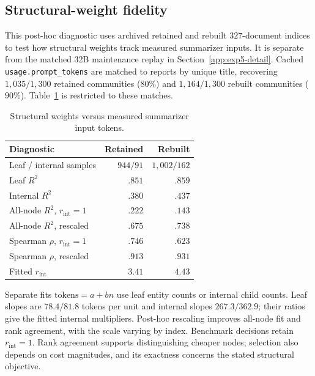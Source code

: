 \subsection{Structural-weight fidelity}\label{app:proxy-cal}

This post-hoc diagnostic uses archived retained and rebuilt
$327$-document indices to test how structural weights track measured
summarizer inputs. It is separate from the matched 32B maintenance replay
in Section~\ref{app:exp5-detail}. Cached \texttt{usage.prompt\_tokens}
are matched to reports by unique title, recovering $1{,}035/1{,}300$
retained communities ($80\%$) and $1{,}164/1{,}300$ rebuilt communities
($90\%$). Table~\ref{tab:proxy-validation} is restricted to these matches.

\begin{table}[tb]
\centering
\caption{Structural weights versus measured summarizer input tokens.}
\label{tab:proxy-validation}
\begin{footnotesize}
\begin{tabular*}{\linewidth}{@{\extracolsep{\fill}}lrr@{}}
\toprule
\textbf{Diagnostic} & \textbf{Retained} & \textbf{Rebuilt} \\
\midrule
Leaf / internal samples & $944/91$ & $1{,}002/162$ \\
Leaf $R^2$ & $.851$ & $.859$ \\
Internal $R^2$ & $.380$ & $.437$ \\
\midrule
All-node $R^2$, $r_{\mathrm{int}}=1$ & $.222$ & $.143$ \\
All-node $R^2$, rescaled & $.675$ & $.738$ \\
Spearman $\rho$, $r_{\mathrm{int}}=1$ & $.746$ & $.623$ \\
Spearman $\rho$, rescaled & $.913$ & $.931$ \\
Fitted $r_{\mathrm{int}}$ & $3.41$ & $4.43$ \\
\bottomrule
\end{tabular*}
\end{footnotesize}
\end{table}

Separate fits $\mathrm{tokens}=a+bn$ use leaf entity counts or internal
child counts. Leaf slopes are $78.4/81.8$ tokens per unit and internal
slopes $267.3/362.9$; their ratios give the fitted internal multipliers.
Post-hoc rescaling improves all-node fit and rank agreement, with the
scale varying by index. Benchmark decisions retain $r_{\mathrm{int}}=1$.
Rank agreement supports distinguishing cheaper nodes; selection also
depends on cost magnitudes, and its exactness concerns the stated
structural objective.


